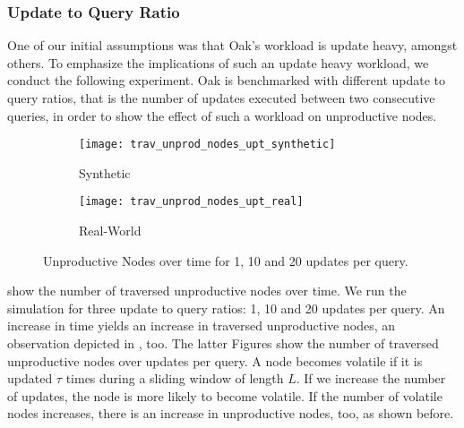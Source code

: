 \documentclass[abstracton,12pt]{scrartcl}
\theoremstyle{definition}
\begin{document}


\subsubsection{Update to Query Ratio}

\label{sec:update-query-ratio}

One of our initial assumptions was that Oak's workload is update heavy, amongst others.
To emphasize the implications of such an update heavy workload, we conduct the following
experiment. Oak is benchmarked with different update to query ratios,
that is the number of updates executed between two consecutive queries,
in order to show the effect of such a workload
on unproductive nodes. 

\begin{figure}[h]
  \centering
  \begin{subfigure}{0.49\linewidth}
    \centering
    \caption{Synthetic}
    \texttt{[image: trav\_unprod\_nodes\_upt\_synthetic]}
    \label{fig:trav_unprod_nodes_upt_synthetic}
  \end{subfigure}
  \begin{subfigure}{0.49\linewidth}
    \centering
    \caption{Real-World}
    \texttt{[image: trav\_unprod\_nodes\_upt\_real]}
    \label{fig:trav_unprod_nodes_upt_real}
  \end{subfigure}
  \vspace{-0.65cm}
  \caption[Unproductive Nodes over time for 1, 10 and 20 updates per query]{
  Unproductive Nodes over time for 1, 10 and 20 updates per query.}
\end{figure}


 show
the number of traversed unproductive nodes over time. We run the simulation for
three update to query ratios: 1, 10 and 20 updates per query. An increase
in time yields an increase in traversed unproductive nodes, an observation
depicted in , too.
The latter Figures show the number of traversed unproductive nodes over updates
per query.
A node becomes volatile if it is updated $\tau$ times during a sliding window of length $L$.
If we increase the number of updates, the node is more likely to become volatile.
If the number of volatile nodes increases, there is an increase in unproductive nodes, too,
as shown before.
\end{document}
